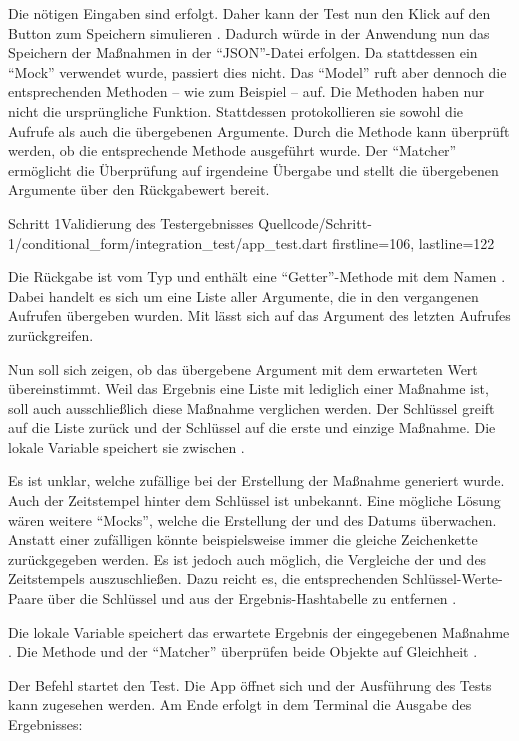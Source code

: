 Die nötigen Eingaben sind erfolgt.
Daher kann der Test nun den Klick auf den Button zum Speichern simulieren .
Dadurch würde in der Anwendung nun das Speichern der Maßnahmen in der \enquote{JSON}-Datei erfolgen.
Da stattdessen ein \enquote{Mock} verwendet wurde, passiert dies nicht.
Das \enquote{Model} ruft aber dennoch die entsprechenden Methoden -- wie zum Beispiel  -- auf.
Die Methoden haben nur nicht die ursprüngliche Funktion.
Stattdessen protokollieren sie sowohl die Aufrufe als auch die übergebenen Argumente.
Durch die Methode   kann überprüft werden, ob die entsprechende Methode  ausgeführt wurde.
Der \enquote{Matcher}  ermöglicht die Überprüfung auf irgendeine Übergabe und stellt die übergebenen Argumente über den Rückgabewert bereit.

\begin{alexlisting}{Schritt 1}{Validierung des Testergebnisses}
  {Quellcode/Schritt-1/conditional_form/integration_test/app_test.dart}
  {firstline=106, lastline=122}

  \label{lst:Schritt1ButtonZumSpeichernWirdAusgelöst}
\end{alexlisting}

Die Rückgabe ist vom Typ  und enthält eine \enquote{Getter}-Methode mit dem Namen .
Dabei handelt es sich um eine Liste aller Argumente, die in den vergangenen Aufrufen übergeben wurden.
Mit  lässt sich auf das Argument des letzten Aufrufes zurückgreifen.

Nun soll sich zeigen, ob das übergebene Argument mit dem erwarteten Wert übereinstimmt.
Weil das Ergebnis eine Liste mit lediglich einer Maßnahme ist, soll auch ausschließlich diese Maßnahme verglichen werden.
Der Schlüssel  greift auf die Liste zurück und der Schlüssel  auf die erste und einzige Maßnahme.
Die lokale Variable  speichert sie zwischen .

Es ist unklar, welche zufällige  bei der Erstellung der Maßnahme generiert wurde.
Auch der Zeitstempel hinter dem Schlüssel  ist unbekannt.
Eine mögliche Lösung wären weitere \enquote{Mocks}, welche die Erstellung der  und des Datums überwachen. Anstatt einer zufälligen  könnte beispielsweise immer die gleiche Zeichenkette zurückgegeben werden.
Es ist jedoch auch möglich, die Vergleiche der  und des Zeitstempels auszuschließen.
Dazu reicht es, die entsprechenden Schlüssel-Werte-Paare über die Schlüssel  und  aus der Ergebnis-Hashtabelle zu entfernen .

Die lokale Variable  speichert das erwartete Ergebnis der eingegebenen Maßnahme .
Die Methode  und der \enquote{Matcher}  überprüfen beide Objekte auf Gleichheit .

Der Befehl  startet den Test.
Die App öffnet sich und der Ausführung des Tests kann zugesehen werden.
Am Ende erfolgt in dem Terminal die Ausgabe des Ergebnisses: 

